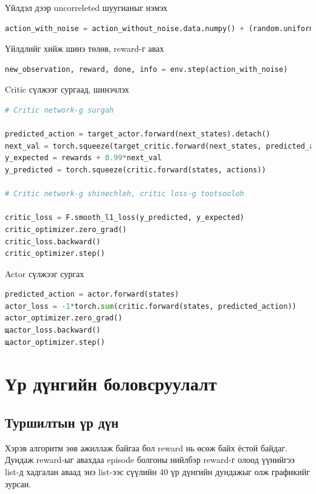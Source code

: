 \documentclass[12pt,A4]{report}
\begin{document}
Үйлдэл дээр uncorreleted шуугианыг нэмэх

\begin{lstlisting}[language=Python, caption=Үйлдэл дээр шуугиан нэмэх, frame=single]
action_with_noise = action_without_noise.data.numpy() + (random.uniform(-0.2, 0.2) * action_max)
\end{lstlisting}

Үйлдлийг хийж шинэ төлөв, reward-г авах

\begin{lstlisting}[language=Python, caption=Үйлдэл хийх, frame=single]
new_observation, reward, done, info = env.step(action_with_noise)
\end{lstlisting}

Critic сүлжээг сургаад, шинэчлэх

\begin{lstlisting}[language=Python, caption=Critic сүлжээг сургах шинэчлэх, frame=single]
# Critic network-g surgah

predicted_action = target_actor.forward(next_states).detach()
next_val = torch.squeeze(target_critic.forward(next_states, predicted_action).detach())
y_expected = rewards + 0.99*next_val
y_predicted = torch.squeeze(critic.forward(states, actions))

# Critic network-g shinechleh, critic loss-g tootsooloh
            
critic_loss = F.smooth_l1_loss(y_predicted, y_expected)
critic_optimizer.zero_grad()
critic_loss.backward()
critic_optimizer.step()
\end{lstlisting}	

Actor сүлжээг сургах

\begin{lstlisting}[language=Python, caption=Actor сүлжээг сургах, frame=single]
predicted_action = actor.forward(states)
actor_loss = -1*torch.sum(critic.forward(states, predicted_action))
actor_optimizer.zero_grad()
щactor_loss.backward()
щactor_optimizer.step()
\end{lstlisting}

\chapter{Үр дүнгийн боловсруулалт}

\section{Туршилтын үр дүн}

Хэрэв алгоритм зөв ажиллаж байгаа бол reward нь өсөж байх ёстой байдаг. Дундаж reward-ыг авахдаа episode болгоны нийлбэр reward-г олоод үүнийгээ list-д хадгалан аваад энэ list-ээс сүүлийн 40 үр дүнгийн дундажыг олж графикийг зурсан.
\end{document}
